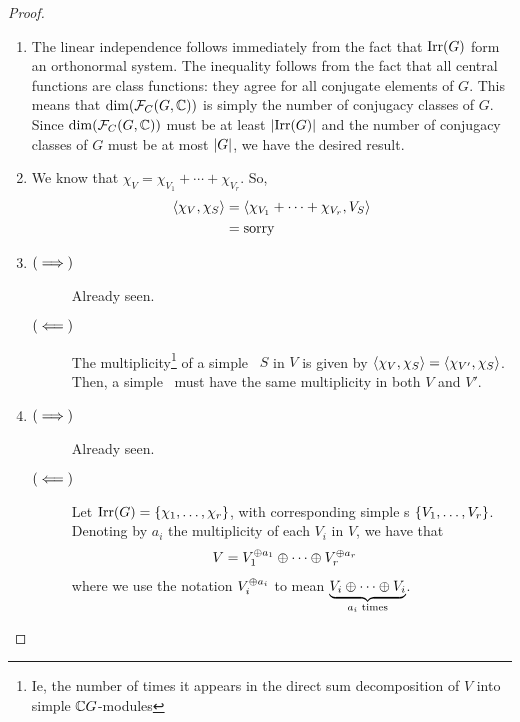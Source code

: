 \begin{proof}
    \hfill
    \begin{enumerate}[label = \normalfont \arabic*.]
        \item The linear independence follows immediately from the fact that $\operatorname{Irr}\!\left( G \right)$ form an orthonormal system. The inequality follows from the fact that all central functions are class functions: they agree for all conjugate elements of $G$. This means that $\dim\!\left( \mathcal{F}_C\!\left( G, \mathbb{C} \right) \right)$ is simply the number of conjugacy classes of $G$. Since $\dim\!\left( \mathcal{F}_C\!\left( G, \mathbb{C} \right) \right)$ must be at least $\left\lvert \operatorname{Irr}\!\left( G \right) \right\rvert$ and the number of conjugacy classes of $G$ must be at most $\left\lvert G \right\rvert$, we have the desired result.
        
        \item We know that $\chi_V = \chi_{V_1} + \cdots + \chi_{V_r}$. So,
        \begin{align*}
            \left\langle \chi_V, \chi_S \right\rangle &= \left\langle \chi_{V_1} + \cdots + \chi_{V_r}, V_S \right\rangle \\
            &= \text{sorry}
        \end{align*}

        \item 
        \begin{description}
            \item[$\left( \implies \right)$] Already seen. %
            \item[$\left( \impliedby \right)$] %
            The multiplicity\footnote{Ie, the number of times it appears in the direct sum decomposition of $V$ into simple $\mathbb{C} G$-modules} of a simple \CGM\ $S$ in $V$ is given by $\left\langle \chi_V, \chi_S \right\rangle = \left\langle \chi_{V'}, \chi_S \right\rangle$. Then, a simple \CGM\ must have the same multiplicity in both $V$ and $V'$. %
        \end{description}

        \item 
        \begin{description}
            \item[$\left( \implies \right)$] Already seen. %
            \item[$\left( \impliedby \right)$] Let $\operatorname{Irr}\!\left( G \right) = \left\{ \chi_1, \ldots, \chi_r \right\}$, with corresponding simple \CGM s $\left\{ V_1, \ldots, V_r \right\}$. Denoting by $a_i$ the multiplicity of each $V_i$ in $V$, we have that
            \begin{align*}
                V &= V_1^{\oplus a_1} \oplus \cdots \oplus V_r^{\oplus a_r}
            \end{align*}
            where we use the notation $V_i^{\oplus a_i}$ to mean $\underbrace{V_i \oplus \cdots \oplus V_i}_{a_i \text{ times}}$.


\end{description}
\end{enumerate}
\end{proof}
